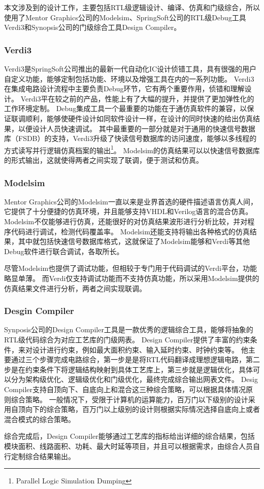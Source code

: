 \documentclass[UTF8]{ctexart}
\begin{document}
本文涉及到的设计工作，主要包括RTL级逻辑设计、编译、仿真和门级综合，所以使用了Mentor Graphics公司的Modelsim、SpringSoft公司的RTL级Debug工具Verdi3和Synopsis公司的门级综合工具Design Compiler。

\subsubsection{Verdi3}

Verdi3是SpringSoft公司推出的最新一代自动化IC设计侦错工具，具有很强的用户自定义功能，能够定制包括功能、环境以及增强工具在内的一系列功能\cite{lun2012}。
Verdi3在集成电路设计流程中主要负责Debug环节，它有两个重要作用，侦错和理解设计。
Verdi3平在较之前的产品，性能上有了大幅的提升，并提供了更加弹性化的工作环境定制。
Debug集成工具一个最重要的功能在于通仿真软件的兼容，以保证联调顺利，能够使硬件设计如同软件设计一样，在设计的同时快速的给出仿真结果，以便设计人员快速调试。
其中最重要的一部分就是对于通用的快速信号数据库（FSDB）的支持，Verdi3升级了快读信号数据库的访问速度，能够以多线程的方式读写并行逻辑仿真档案的输出\footnote{Parallel Logic Simulation Dumping}。
Modelsim的仿真结果可以以快速信号数据库的形式输出，这就使得两者之间实现了联调，便于测试和仿真。

\subsubsection{Modelsim}

Mentor Graphics公司的Modelsim一直以来是业界首选的硬件描述语言仿真人间，它提供了十分便捷的仿真环境，并且能够支持VHDL和Verilog语言的混合仿真\cite{fanj2010}。
Modelsim不仅能够进行仿真，还能很好的对仿真结果波形进行分析比较，并对程序代码进行调试，检测代码覆盖率。
Modelsim还能支持将输出各种格式的仿真结果，其中就包括快速信号数据库格式，这就保证了Modelsim能够和Verdi等其他Debug软件进行联合调试，各取所长。

尽管Modelsim也提供了调试功能，但相较于专门用于代码调试的Verdi平台，功能略显单薄。
而Verdi仅支持调试功能而不支持仿真功能，所以采用Modelsim提供的仿真结果文件进行分析，两者之间实现联调。

\subsubsection{Desgin Compiler}

Synposis公司的Design Compiler工具是一款优秀的逻辑综合工具，能够将抽象的RTL级代码综合为对应工艺库的门级网表。
Design Compiler提供了丰富的约束条件，来对设计进行约束，例如最大面积约束、输入延时约束、时钟约束等。
他主要通过三个步骤完成电路综合，第一步是是将RTL代码翻译成理想逻辑电路，第二步是在约束条件下将逻辑结构映射到具体工艺库上，第三步就是逻辑优化，具体可以分为架构级优化、逻辑级优化和门级优化，最终完成综合输出网表文件\cite{yangg2010}。
Desig Compiler支持自顶向下、自底向上和混合这三种综合策略，可以根据具体情况原则综合策略。
一般情况下，受限于计算机的运算能力，百万门以下级别的设计采用自顶向下的综合策略，百万门以上级别的设计则根据实际情况选择自底向上或者混合模式的综合策略。

综合完成后，Design Compiler能够通过工艺库的指标给出详细的综合结果，包括模块面积、线路面积、功耗、最大时延等项目，并且可以根据需求，由综合人员自行定制综合结果输出。


\end{document}
